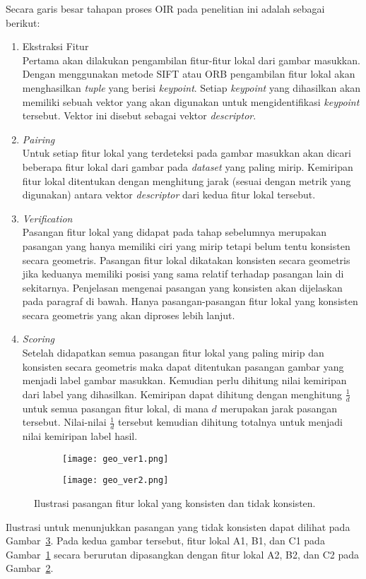 Secara garis besar tahapan proses OIR pada penelitian ini adalah sebagai berikut:
\begin{enumerate}
	\item Ekstraksi Fitur \\
	Pertama akan dilakukan pengambilan fitur-fitur lokal dari gambar masukkan. Dengan menggunakan metode SIFT atau ORB pengambilan fitur lokal akan menghasilkan \textit{tuple} yang  berisi \textit{keypoint}. Setiap \textit{keypoint} yang dihasilkan akan memiliki sebuah vektor yang akan digunakan untuk mengidentifikasi \textit{keypoint} tersebut. Vektor ini disebut sebagai vektor \textit{descriptor}.
	\item \textit{Pairing} \\
	Untuk setiap fitur lokal yang terdeteksi pada gambar masukkan akan dicari beberapa fitur lokal dari gambar pada \textit{dataset} yang paling mirip. Kemiripan fitur lokal ditentukan dengan menghitung jarak (sesuai dengan metrik yang digunakan) antara vektor \textit{descriptor} dari kedua fitur lokal tersebut.
	\item \textit{Verification} \\
	Pasangan fitur lokal yang didapat pada tahap sebelumnya merupakan pasangan yang hanya memiliki ciri yang mirip tetapi belum tentu konsisten secara geometris. Pasangan fitur lokal dikatakan konsisten secara geometris jika keduanya memiliki posisi yang sama relatif terhadap pasangan lain di sekitarnya. Penjelasan mengenai pasangan yang konsisten akan dijelaskan pada paragraf di bawah. Hanya pasangan-pasangan fitur lokal yang konsisten secara geometris yang akan diproses lebih lanjut.
	\item \textit{Scoring} \\
	Setelah didapatkan semua pasangan fitur lokal yang paling mirip dan konsisten secara geometris maka dapat ditentukan pasangan gambar yang menjadi label gambar masukkan. Kemudian perlu dihitung nilai kemiripan dari label yang dihasilkan. Kemiripan dapat dihitung dengan menghitung $\frac{1}{d}$ untuk semua pasangan fitur lokal, di mana $d$ merupakan jarak pasangan tersebut. Nilai-nilai $\frac{1}{d}$ tersebut kemudian dihitung totalnya untuk menjadi nilai kemiripan label hasil.
\end{enumerate}
\begin{figure}[H]
	\begin{subfigure}[b]{.5\textwidth}
		\centering
		\texttt{[image: geo\_ver1.png]}
		\caption{}
		\label{subfig:geo_ver1}
	\end{subfigure}%
	\begin{subfigure}[b]{.5\textwidth}
		\centering
		\texttt{[image: geo\_ver2.png]}
		\caption{}
		\label{subfig:geo_ver2}
	\end{subfigure}
	\caption{Ilustrasi pasangan fitur lokal yang konsisten dan tidak konsisten.}
	\label{fig:geo_ver}
\end{figure}
Ilustrasi untuk menunjukkan pasangan yang tidak konsisten dapat dilihat pada Gambar~\ref{fig:geo_ver}. Pada kedua gambar tersebut, fitur lokal A1, B1, dan C1 pada Gambar~\ref{subfig:geo_ver1} secara berurutan dipasangkan dengan fitur lokal A2, B2, dan C2 pada Gambar~\ref{subfig:geo_ver2}. 

